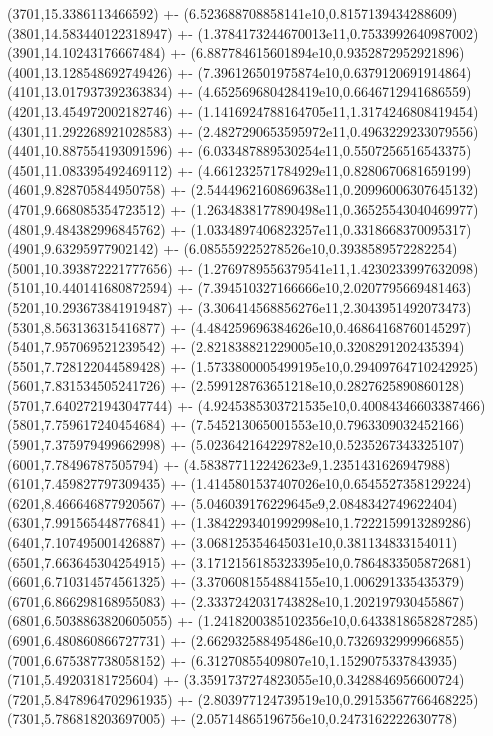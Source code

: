 {(3701,15.3386113466592) +- (6.523688708858141e10,0.8157139434288609)
(3801,14.583440122318947) +- (1.3784173244670013e11,0.7533992640987002)
(3901,14.10243176667484) +- (6.887784615601894e10,0.9352872952921896)
(4001,13.128548692749426) +- (7.396126501975874e10,0.6379120691914864)
(4101,13.017937392363834) +- (4.652569680428419e10,0.6646712941686559)
(4201,13.454972002182746) +- (1.1416924788164705e11,1.3174246808419454)
(4301,11.292268921028583) +- (2.4827290653595972e11,0.4963229233079556)
(4401,10.887554193091596) +- (6.033487889530254e11,0.5507256516543375)
(4501,11.083395492469112) +- (4.661232571784929e11,0.8280670681659199)
(4601,9.828705844950758) +- (2.5444962160869638e11,0.20996006307645132)
(4701,9.668085354723512) +- (1.2634838177890498e11,0.36525543040469977)
(4801,9.484382996845762) +- (1.0334897406823257e11,0.3318668370095317)
(4901,9.63295977902142) +- (6.085559225278526e10,0.3938589572282254)
(5001,10.393872221777656) +- (1.2769789556379541e11,1.4230233997632098)
(5101,10.440141680872594) +- (7.394510327166666e10,2.0207795669481463)
(5201,10.293673841919487) +- (3.306414568856276e11,2.3043951492073473)
(5301,8.563136315416877) +- (4.484259696384626e10,0.46864168760145297)
(5401,7.957069521239542) +- (2.821838821229005e10,0.3208291202435394)
(5501,7.728122044589428) +- (1.5733800005499195e10,0.29409764710242925)
(5601,7.831534505241726) +- (2.599128763651218e10,0.2827625890860128)
(5701,7.6402721943047744) +- (4.9245385303721535e10,0.40084346603387466)
(5801,7.759617240454684) +- (7.545213065001553e10,0.7963309032452166)
(5901,7.375979499662998) +- (5.023642164229782e10,0.5235267343325107)
(6001,7.78496787505794) +- (4.583877112242623e9,1.2351431626947988)
(6101,7.459827797309435) +- (1.4145801537407026e10,0.6545527358129224)
(6201,8.466646877920567) +- (5.046039176229645e9,2.0848342749622404)
(6301,7.991565448776841) +- (1.3842293401992998e10,1.7222159913289286)
(6401,7.107495001426887) +- (3.068125354645031e10,0.381134833154011)
(6501,7.663645304254915) +- (3.1712156185323395e10,0.7864833505872681)
(6601,6.710314574561325) +- (3.3706081554884155e10,1.006291335435379)
(6701,6.866298168955083) +- (2.3337242031743828e10,1.202197930455867)
(6801,6.5038863820605055) +- (1.2418200385102356e10,0.6433818658287285)
(6901,6.480860866727731) +- (2.662932588495486e10,0.7326932999966855)
(7001,6.675387738058152) +- (6.31270855409807e10,1.1529075337843935)
(7101,5.49203181725604) +- (3.3591737274823055e10,0.3428846956600724)
(7201,5.8478964702961935) +- (2.803977124739519e10,0.29153567766468225)
(7301,5.786818203697005) +- (2.05714865196756e10,0.2473162222630778)
}
